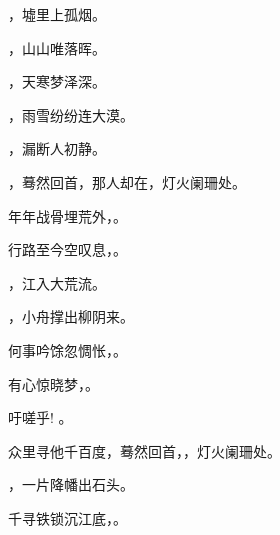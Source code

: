 \documentclass[12pt, a4paper, addpoints, answers]{exam}
\begin{document}
\begin{questions}
\question[3] \fillin ，墟里上孤烟。

   

 

\question[3] \fillin ，山山唯落晖。

   

 

\question[3] \fillin ，天寒梦泽深。

   

 

\question[3] \fillin ，雨雪纷纷连大漠。

   

 

\question[3] \fillin ，漏断人初静。

   

 

\question[3] \fillin ，蓦然回首，那人却在，灯火阑珊处。

   

 

\question[3] 年年战骨埋荒外，\fillin 。

   

 

\question[3] 行路至今空叹息，\fillin 。

   

 

\question[3] \fillin ，江入大荒流。

   

 

\question[3] \fillin ，小舟撑出柳阴来。

   

 

\question[3] 何事吟馀忽惆怅，\fillin 。

   

 

\question[3] 有心惊晓梦，\fillin 。

   

 

\question[3] 吁嗟乎! \fillin 。

   

 

\question[3] 众里寻他千百度，蓦然回首，\fillin ，灯火阑珊处。

   

 

\question[3] \fillin ，一片降幡出石头。

   

 

\question[3] 千寻铁锁沉江底，\fillin 。


\end{questions}
\end{document}
